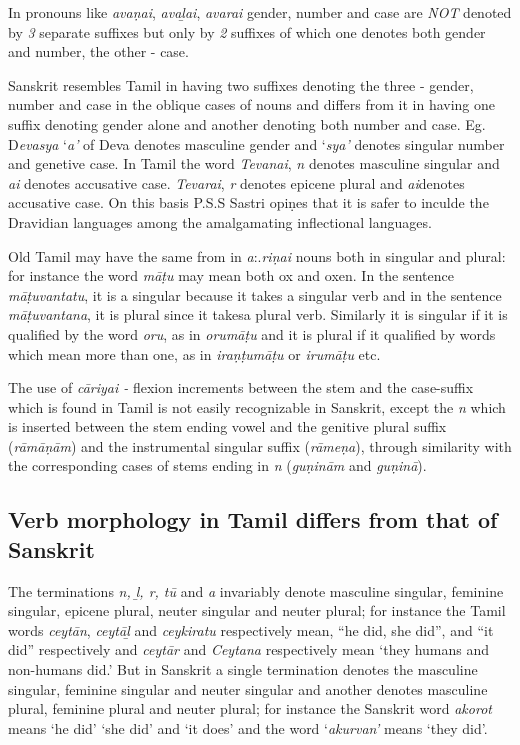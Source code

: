 In pronouns like \textit{avaṇai}, \textit{avaḻai}, \textit{avarai} gender, number and case are \textit{NOT} denoted by \textit{3} separate suffixes but only by\textit{ 2} suffixes of which one denotes both gender and number, the other - case.

Sanskrit resembles Tamil in having two suffixes denoting the three - gender, number and case in the oblique cases of nouns and differs from it in having one suffix denoting gender alone and another denoting both number and case. Eg. D\textit{evasya} ‘\textit{a’} of Deva denotes masculine gender and ‘\textit{sya’} denotes singular number and genetive case. In Tamil the word \textit{Tevanai},\textit{ n} denotes masculine singular and \textit{ai} denotes accusative case. \textit{Tevarai}, \textit{r} denotes epicene plural and \textit{ai}denotes accusative case. On this basis P.S.S Sastri opiṇes that it is safer to inculde the Dravidian languages among the amalgamating inflectional languages.

Old Tamil may have the same from in \textit{a}:.\textit{riṇai} nouns both in singular and plural: for instance the word \textit{māṭu} may mean both ox and oxen. In the sentence \textit{māṭuvantatu}, it is a singular because it takes a singular verb and in the sentence \textit{māṭuvantana}, it is plural since it takesa plural verb. Similarly it is singular if it is qualified by the word \textit{oru}, as in \textit{orumāṭu} and it is plural if it qualified by words which mean more than one, as in \textit{iraṇṭumāṭu} or \textit{irumāṭu} etc.

The use of \textit{cāriyai -} flexion increments between the stem and the case-suffix which is found in Tamil is not easily recognizable in Sanskrit, except the \textit{n} which is inserted between the stem ending vowel and the genitive plural suffix (\textit{rāmāṇām}) and the instrumental singular suffix (\textit{rāmeṇa}), through similarity with the corresponding cases of stems ending in \textit{n} (\textit{guṇinām} and \textit{guṇinā}).

\subsection*{Verb morphology in Tamil differs from that of Sanskrit}

The terminations \textit{n, ḻ, r, tū} and \textit{a} invariably denote masculine singular, feminine singular, epicene plural, neuter singular and neuter plural; for instance the Tamil words \textit{ceytān}, \textit{ceytāḻ} and \textit{ceykiratu} respectively mean, “he did, she did”, and “it did” respectively and \textit{ceytār} and \textit{Ceytana} respectively mean ‘they humans and non-humans did.’ But in Sanskrit a single termination denotes the masculine singular, feminine singular and neuter singular and another denotes masculine plural, feminine plural and neuter plural; for instance the Sanskrit word \textit{akorot} means ‘he did’ ‘she did’ and ‘it does’ and the word ‘\textit{akurvan’} means ‘they did’.

